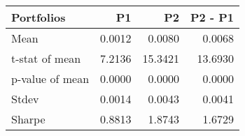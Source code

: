 \begin{tabular}{lrrr}
\toprule
Portfolios & P1 & P2 & P2 - P1 \\
\midrule
Mean & 0.0012 & 0.0080 & 0.0068 \\
t-stat of mean & 7.2136 & 15.3421 & 13.6930 \\
p-value of mean & 0.0000 & 0.0000 & 0.0000 \\
Stdev & 0.0014 & 0.0043 & 0.0041 \\
Sharpe & 0.8813 & 1.8743 & 1.6729 \\
\bottomrule
\end{tabular}
